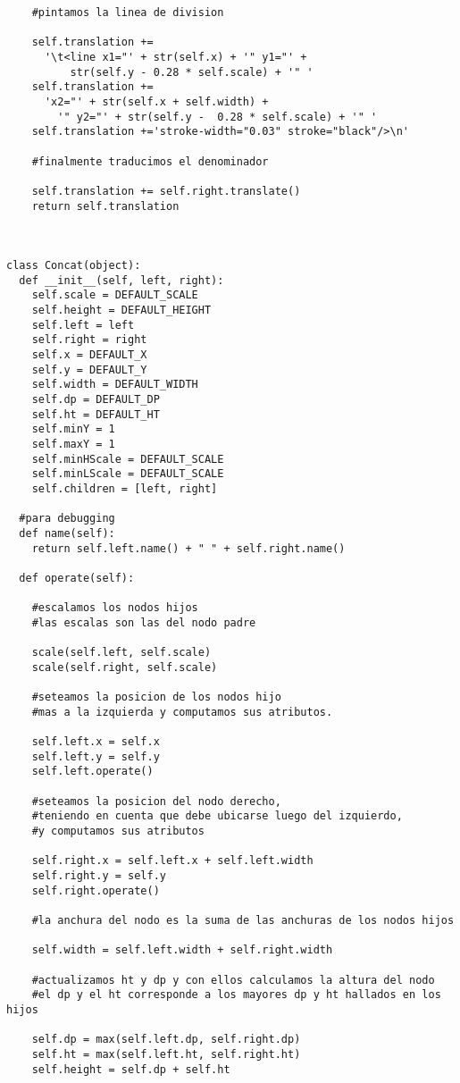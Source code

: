 \begin{verbatim}
    #pintamos la linea de division

    self.translation += 
      '\t<line x1="' + str(self.x) + '" y1="' + 
          str(self.y - 0.28 * self.scale) + '" '
    self.translation += 
      'x2="' + str(self.x + self.width) +
        '" y2="' + str(self.y -  0.28 * self.scale) + '" '
    self.translation +='stroke-width="0.03" stroke="black"/>\n'
    
    #finalmente traducimos el denominador

    self.translation += self.right.translate()
    return self.translation



class Concat(object):
  def __init__(self, left, right):
    self.scale = DEFAULT_SCALE
    self.height = DEFAULT_HEIGHT
    self.left = left
    self.right = right
    self.x = DEFAULT_X
    self.y = DEFAULT_Y
    self.width = DEFAULT_WIDTH
    self.dp = DEFAULT_DP
    self.ht = DEFAULT_HT
    self.minY = 1
    self.maxY = 1
    self.minHScale = DEFAULT_SCALE
    self.minLScale = DEFAULT_SCALE
    self.children = [left, right]
    
  #para debugging
  def name(self):
    return self.left.name() + " " + self.right.name()

  def operate(self):

    #escalamos los nodos hijos
    #las escalas son las del nodo padre

    scale(self.left, self.scale)
    scale(self.right, self.scale)

    #seteamos la posicion de los nodos hijo 
    #mas a la izquierda y computamos sus atributos.

    self.left.x = self.x
    self.left.y = self.y
    self.left.operate()

    #seteamos la posicion del nodo derecho, 
    #teniendo en cuenta que debe ubicarse luego del izquierdo,
    #y computamos sus atributos

    self.right.x = self.left.x + self.left.width
    self.right.y = self.y
    self.right.operate()

    #la anchura del nodo es la suma de las anchuras de los nodos hijos

    self.width = self.left.width + self.right.width

    #actualizamos ht y dp y con ellos calculamos la altura del nodo
    #el dp y el ht corresponde a los mayores dp y ht hallados en los hijos

    self.dp = max(self.left.dp, self.right.dp)
    self.ht = max(self.left.ht, self.right.ht)
    self.height = self.dp + self.ht
    


\end{verbatim}
